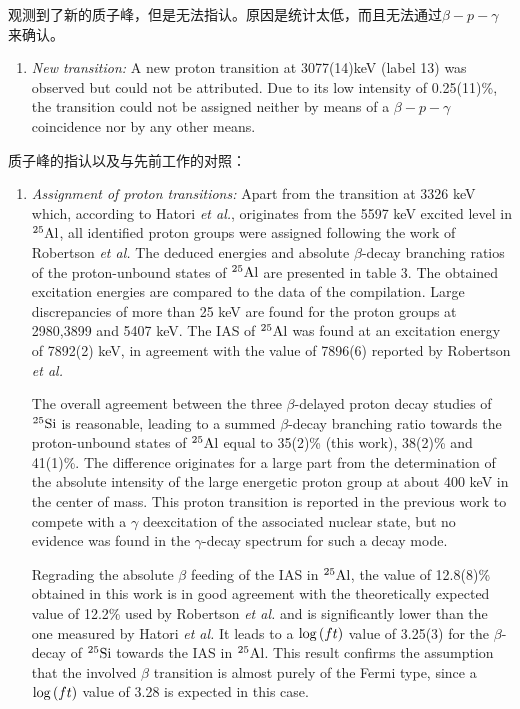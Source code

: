 \documentclass[UTF8]{ctexart}
\begin{document}
观测到了新的质子峰，但是无法指认。原因是统计太低，而且无法通过$\beta -p-\gamma $来确认。
\begin{enumerate}
    \item \textit{New transition:} A new proton transition at 3077(14)keV (label 13) was observed but could not be attributed. Due to its low intensity of 0.25(11)\%, the transition could not be assigned neither by means of a $\beta-p-\gamma $ coincidence nor by any other means.
\end{enumerate}

质子峰的指认以及与先前工作的对照：
\begin{enumerate}
    \item \textit{Assignment of proton transitions:} Apart from the transition at 3326 keV which, according to Hatori \textit{et al.}, originates from the 5597 keV excited level in $^{25}\textnormal{Al}$, all identified proton groups were assigned following the work of Robertson \textit{et al.} The deduced energies and absolute $\beta$-decay branching ratios of the proton-unbound states of $^{25}\textnormal{Al}$ are presented in table 3. The obtained excitation energies are compared to the data of the compilation. Large discrepancies of more than 25 keV are found for the proton groups at 2980,3899 and 5407 keV. The IAS of $^{25}\textnormal{Al}$ was found at an excitation energy of 7892(2) keV, in agreement with the value of 7896(6) reported by Robertson \textit{et al.} 
    
    The overall agreement between the three $\beta$-delayed proton decay studies of $^{25}\textnormal{Si}$ is reasonable, leading to a summed $\beta$-decay branching ratio towards the proton-unbound states of $^{25}\textnormal{Al}$ equal to 35(2)\% (this work), 38(2)\% and 41(1)\%. The difference originates for a large part from the determination of the absolute intensity of the large energetic proton group at about 400 keV in the center of mass. This proton transition is reported in the previous work to compete with a $\gamma$ deexcitation of the associated nuclear state, but no evidence was found in the $\gamma$-decay spectrum for such a decay mode.

    Regrading the absolute $\beta$ feeding of the IAS in $^{25}\textnormal{Al}$, the value of 12.8(8)\% obtained in this work is in good agreement with the theoretically expected value of 12.2\% used by Robertson \textit{et al.} and is significantly lower than the one measured by Hatori \textit{et al.} It leads to a $\textnormal{log}\left( ft \right)$ value of 3.25(3) for the $\beta$-decay of $^{25}\textnormal{Si}$ towards the IAS in $^{25}\textnormal{Al}$. This result confirms the assumption that the involved $\beta$ transition is almost purely of the Fermi type, since a $\textnormal{log}\left( ft \right)$ value of 3.28 is expected in this case.
\end{enumerate}
\end{document}
